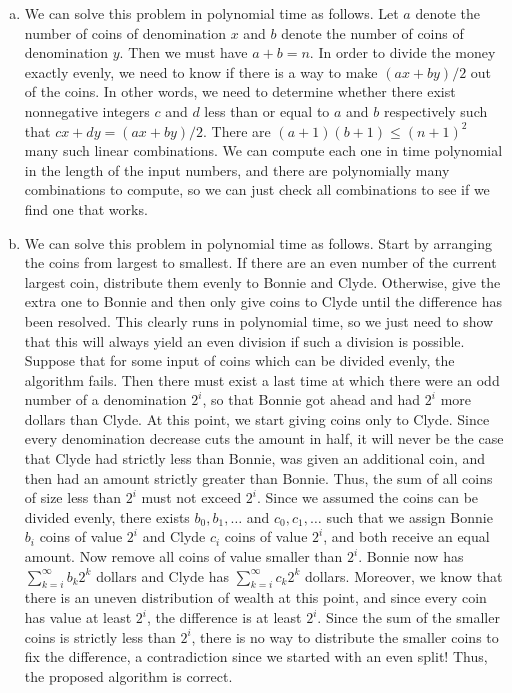 \documentclass{article}
\begin{document}
\begin{enumerate}[a.]
\item We can solve this problem in polynomial time as follows.  Let $a$ denote the number of coins of denomination $x$ and $b$ denote the number of coins of denomination $y$.  Then we must have $a+b=n$.  In order to divide the money exactly evenly, we need to know if there is a way to make $(ax+by)/2$ out of the coins.  In other words, we need to determine whether there exist nonnegative integers $c$ and $d$ less than or equal to $a$ and $b$ respectively such that $cx + dy = (ax+by)/2$.  There are $(a+1)(b+1) \leq (n+1)^2$ many such linear combinations.  We can compute each one in time polynomial in the length of the input numbers, and there are polynomially many combinations to compute, so we can just check all combinations to see if we find one that works. 

\item We can solve this problem in polynomial time as follows.  Start by arranging the coins from largest to smallest.  If there are an even number of the current largest coin, distribute them evenly to Bonnie and Clyde.  Otherwise, give the extra one to Bonnie and then only give coins to Clyde until the difference has been resolved.  This clearly runs in polynomial time, so we just need to show that this will always yield an even division if such a division is possible.  Suppose that for some input of coins which can be divided evenly, the algorithm fails.  Then there must exist a last time at which there were an odd number of a denomination $2^i$, so that Bonnie got ahead and had $2^i$ more dollars than Clyde. At this point, we start giving coins only to Clyde.  Since every denomination decrease cuts the amount in half, it will never be the case that Clyde had strictly less than Bonnie, was given an additional coin, and then had an amount strictly greater than Bonnie.  Thus, the sum of all coins of size less than $2^i$ must not exceed $2^i$.  Since we assumed the coins can be divided evenly, there exists $b_0, b_1, \ldots$ and $c_0, c_1, \ldots$ such that we assign Bonnie $b_i$ coins of value $2^i$ and Clyde $c_i$ coins of value $2^i$, and both receive an equal amount.  Now remove all coins of value smaller than $2^i$.  Bonnie now has $\sum_{k=i}^\infty b_k2^k$ dollars and Clyde has $\sum_{k=i}^\infty c_k2^k$ dollars.  Moreover, we know that there is an uneven distribution of wealth at this point, and since every coin has value at least $2^i$, the difference is at least $2^i$.  Since the sum of the smaller coins is strictly less than $2^i$, there is no way to distribute the smaller coins to fix the difference, a contradiction since we started with an even split!  Thus, the proposed algorithm is correct. 
 

\end{enumerate}
\end{document}
